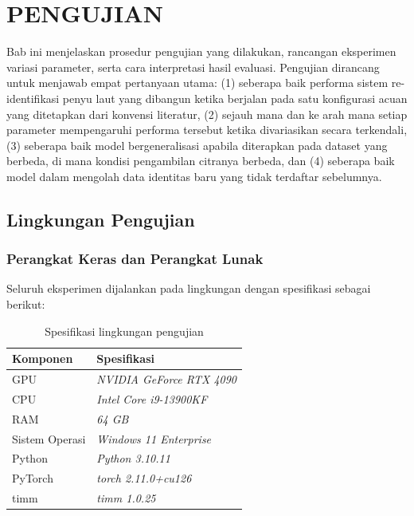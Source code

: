 \chapter{PENGUJIAN}
\label{sec:chap4_pengujian}
\vspace{1ex}

Bab ini menjelaskan prosedur pengujian yang dilakukan, rancangan eksperimen variasi parameter, serta cara interpretasi hasil evaluasi. Pengujian dirancang untuk menjawab empat pertanyaan utama: (1) seberapa baik performa sistem re-identifikasi penyu laut yang dibangun ketika berjalan pada satu konfigurasi acuan yang ditetapkan dari konvensi literatur, (2) sejauh mana dan ke arah mana setiap parameter mempengaruhi performa tersebut ketika divariasikan secara terkendali, (3) seberapa baik model bergeneralisasi apabila diterapkan pada dataset yang berbeda, di mana kondisi pengambilan citranya berbeda, dan (4) seberapa baik model dalam mengolah data identitas baru yang tidak terdaftar sebelumnya.

\section{Lingkungan Pengujian}
\subsection{Perangkat Keras dan Perangkat Lunak}

Seluruh eksperimen dijalankan pada lingkungan dengan spesifikasi sebagai berikut:

\begin{table}[ht]
    \centering
    \caption{Spesifikasi lingkungan pengujian}
    \label{tab:env}
    \renewcommand{\arraystretch}{1.25}
    \begin{tabular}{ll}
        \hline
        \textbf{Komponen} & \textbf{Spesifikasi}             \\
        \hline
        GPU               & \textit{NVIDIA GeForce RTX 4090} \\
        CPU               & \textit{Intel Core i9-13900KF}   \\
        RAM               & \textit{64 GB}                   \\
        Sistem Operasi    & \textit{Windows 11 Enterprise}   \\
        Python            & \textit{Python 3.10.11}          \\
        PyTorch           & \textit{torch 2.11.0+cu126}      \\
        timm              & \textit{timm 1.0.25}             \\
        \hline
    \end{tabular}
\end{table}

